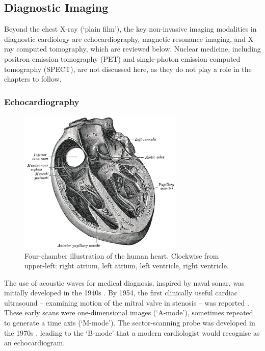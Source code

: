 \subsection{Diagnostic Imaging}
\label{sub:diagnostic}

Beyond the chest X-ray (`plain film'), the key non-invasive imaging modalities in diagnostic cardiology are echocardiography, magnetic resonance imaging, and X-ray computed tomography, which are reviewed below.  Nuclear medicine, including positron emission tomography (PET) and single-photon emission computed tomography (SPECT), are not discussed here, as they do not play a role in the chapters to follow.

\subsubsection{Echocardiography}

\begin{figure}
    \centering\includegraphics[width=0.7\textwidth]{figures/sample/Gray498.png} 
    \caption[Four-chamber illustration of the human heart.]{Four-chamber illustration of the human heart.  Clockwise from upper-left: right atrium, left atrium, left ventricle, right ventricle.}
\label{fig:fourchamber}\end{figure}

The use of acoustic waves for medical diagnosis, inspired by naval sonar, was initially developed in the 1940s \cite{gagliardi_ultrasonography_1996}.  By 1954, the first clinically useful cardiac ultrasound -- examining motion of the mitral valve in stenosis -- was reported \cite{edler_ultrasonic_1957}.  These early scans were one-dimensional images (`A-mode'), sometimes repeated to generate a time axis (`M-mode').   The sector-scanning probe was developed in the 1970s \cite{bom_ultrasonic_1971,griffith_sector_1974}, leading to the `B-mode' that a modern cardiologist would recognise as an echocardiogram.
